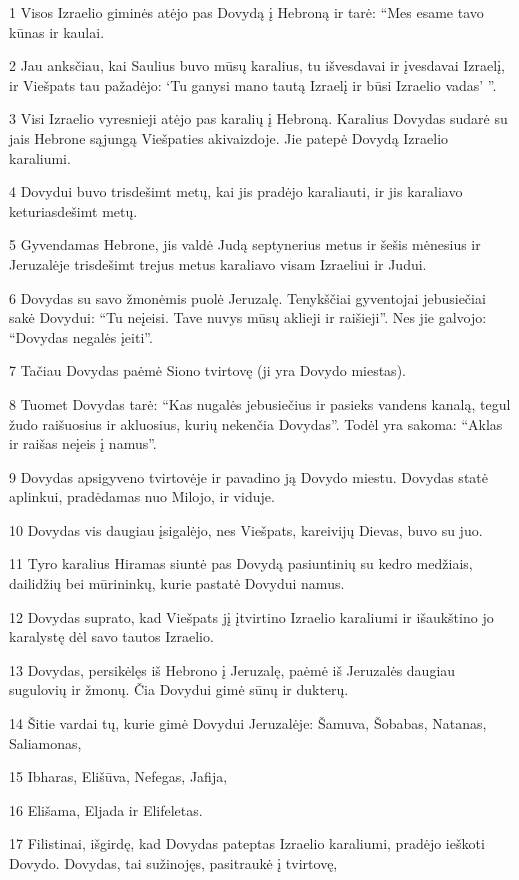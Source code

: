 \par 1 Visos Izraelio giminės atėjo pas Dovydą į Hebroną ir tarė: “Mes esame tavo kūnas ir kaulai. 
\par 2 Jau anksčiau, kai Saulius buvo mūsų karalius, tu išvesdavai ir įvesdavai Izraelį, ir Viešpats tau pažadėjo: ‘Tu ganysi mano tautą Izraelį ir būsi Izraelio vadas’ ”. 
\par 3 Visi Izraelio vyresnieji atėjo pas karalių į Hebroną. Karalius Dovydas sudarė su jais Hebrone sąjungą Viešpaties akivaizdoje. Jie patepė Dovydą Izraelio karaliumi. 
\par 4 Dovydui buvo trisdešimt metų, kai jis pradėjo karaliauti, ir jis karaliavo keturiasdešimt metų. 
\par 5 Gyvendamas Hebrone, jis valdė Judą septynerius metus ir šešis mėnesius ir Jeruzalėje trisdešimt trejus metus karaliavo visam Izraeliui ir Judui. 
\par 6 Dovydas su savo žmonėmis puolė Jeruzalę. Tenykščiai gyventojai jebusiečiai sakė Dovydui: “Tu neįeisi. Tave nuvys mūsų aklieji ir raišieji”. Nes jie galvojo: “Dovydas negalės įeiti”. 
\par 7 Tačiau Dovydas paėmė Siono tvirtovę (ji yra Dovydo miestas). 
\par 8 Tuomet Dovydas tarė: “Kas nugalės jebusiečius ir pasieks vandens kanalą, tegul žudo raišuosius ir akluosius, kurių nekenčia Dovydas”. Todėl yra sakoma: “Aklas ir raišas neįeis į namus”. 
\par 9 Dovydas apsigyveno tvirtovėje ir pavadino ją Dovydo miestu. Dovydas statė aplinkui, pradėdamas nuo Milojo, ir viduje. 
\par 10 Dovydas vis daugiau įsigalėjo, nes Viešpats, kareivijų Dievas, buvo su juo. 
\par 11 Tyro karalius Hiramas siuntė pas Dovydą pasiuntinių su kedro medžiais, dailidžių bei mūrininkų, kurie pastatė Dovydui namus. 
\par 12 Dovydas suprato, kad Viešpats jį įtvirtino Izraelio karaliumi ir išaukštino jo karalystę dėl savo tautos Izraelio. 
\par 13 Dovydas, persikėlęs iš Hebrono į Jeruzalę, paėmė iš Jeruzalės daugiau sugulovių ir žmonų. Čia Dovydui gimė sūnų ir dukterų. 
\par 14 Šitie vardai tų, kurie gimė Dovydui Jeruzalėje: Šamuva, Šobabas, Natanas, Saliamonas, 
\par 15 Ibharas, Elišūva, Nefegas, Jafija, 
\par 16 Elišama, Eljada ir Elifeletas. 
\par 17 Filistinai, išgirdę, kad Dovydas pateptas Izraelio karaliumi, pradėjo ieškoti Dovydo. Dovydas, tai sužinojęs, pasitraukė į tvirtovę, 
